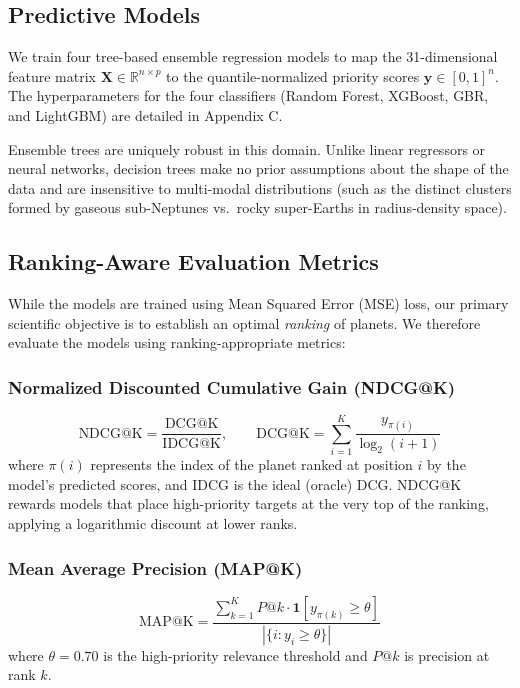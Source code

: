 \documentclass[11pt,a4paper]{article}
\begin{document}
\subsection{Predictive Models}

We train four tree-based ensemble regression models to map the 31-dimensional feature matrix $\mathbf{X} \in \mathbb{R}^{n \times p}$ to the quantile-normalized priority scores $\mathbf{y} \in [0,1]^n$. The hyperparameters for the four classifiers (Random Forest, XGBoost, GBR, and LightGBM) are detailed in Appendix C.

Ensemble trees are uniquely robust in this domain. Unlike linear regressors or neural networks, decision trees make no prior assumptions about the shape of the data and are insensitive to multi-modal distributions (such as the distinct clusters formed by gaseous sub-Neptunes vs.\ rocky super-Earths in radius-density space).

\subsection{Ranking-Aware Evaluation Metrics}

While the models are trained using Mean Squared Error (MSE) loss, our primary scientific objective is to establish an optimal \textit{ranking} of planets. We therefore evaluate the models using ranking-appropriate metrics:

\subsubsection{Normalized Discounted Cumulative Gain (NDCG@K)}
\begin{equation}
\text{NDCG@K} = \frac{\text{DCG@K}}{\text{IDCG@K}}, \qquad \text{DCG@K} = \sum_{i=1}^{K} \frac{y_{\pi(i)}}{\log_2(i+1)}
\label{eq:ndcg}
\end{equation}
where $\pi(i)$ represents the index of the planet ranked at position $i$ by the model's predicted scores, and IDCG is the ideal (oracle) DCG. NDCG@K rewards models that place high-priority targets at the very top of the ranking, applying a logarithmic discount at lower ranks.

\subsubsection{Mean Average Precision (MAP@K)}
\begin{equation}
\text{MAP@K} = \frac{\sum_{k=1}^{K} P@k \cdot \mathbf{1}[y_{\pi(k)} \geq \theta]}{|\{i : y_i \geq \theta\}|}
\label{eq:map}
\end{equation}
where $\theta = 0.70$ is the high-priority relevance threshold and $P@k$ is precision at rank $k$.
\end{document}
